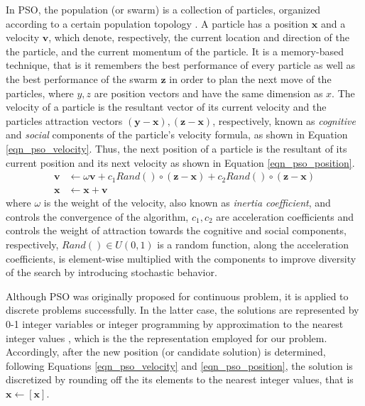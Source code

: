In PSO, the population (or swarm) is a collection of particles, organized according to a certain population topology \cite{Liu2016TopologyOptimization}. A particle has a position $\textbf{x}$ and a velocity $\textbf{v}$, which denote, respectively, the current location and direction of the the particle, and the current momentum of the particle. It is a memory-based technique, that is it remembers the best performance of every particle as well as the best performance of the swarm $\textbf{z}$ in order to plan the next move of the particles, where $y,z$ are position vectors and have the same dimension as $x$. The velocity of a particle is the resultant vector of its current velocity and the particles attraction vectors $(\textbf{y}-\textbf{x}), (\textbf{z}-\textbf{x})$, respectively, known as \textit{cognitive} and \textit{social} components of the  particle's velocity formula, as shown in Equation \ref{eqn_pso_velocity}. Thus, the next position of a particle is the resultant of its current position and its next velocity as shown in Equation \ref{eqn_pso_position}.
\begin{align}
    \label{eqn_pso_velocity}
    \textbf{v} &\leftarrow  \omega\textbf{v} + c_1Rand()\circ(\textbf{z}-\textbf{x}) + c_2Rand()\circ(\textbf{z}-\textbf{x})\\
    \label{eqn_pso_position}
    \textbf{x} &\leftarrow \textbf{x} + \textbf{v}
\end{align}
where $\omega$ is the weight of the velocity, also known as \textit{inertia coefficient}, and controls the convergence of the algorithm, $c_1, c_2$ are acceleration coefficients and controls the weight of attraction towards the cognitive and social components, respectively, $Rand()\in U(0,1)$ is a random function, along the acceleration coefficients, is element-wise multiplied with the components to improve diversity of the search by introducing stochastic behavior.

Although PSO was originally proposed for continuous problem, it is applied to discrete problems successfully. In the latter case, the solutions are represented by 0-1 integer variables \cite{KennedyAAlgorithm} or integer programming by approximation to the nearest integer values \cite{Clerc2000DiscreteProblem}, which is the the representation employed for our problem. Accordingly, after the new position (or candidate solution) is determined, following Equations \ref{eqn_pso_velocity} and \ref{eqn_pso_position}, the solution is discretized by rounding off the its elements to the nearest integer values, that is $\textbf{x}\leftarrow [\textbf{x}]$.


